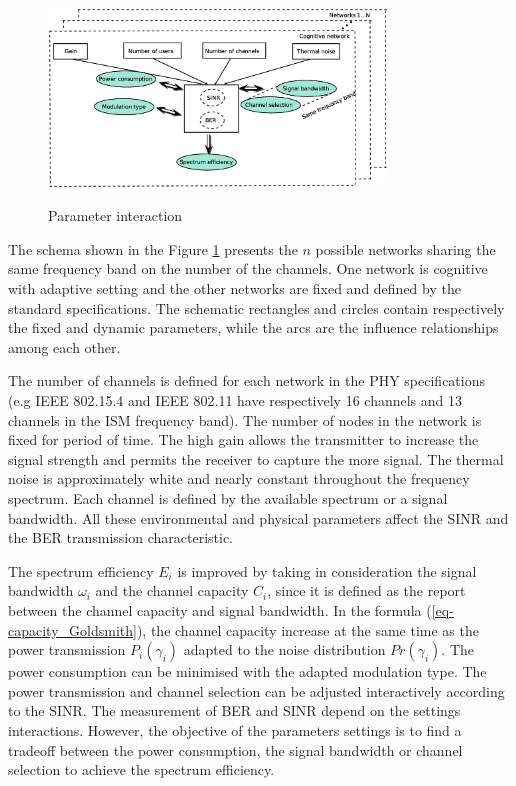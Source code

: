 \documentclass[conference]{IEEEtran}
\begin{document}
\begin{figure}[h]
   \includegraphics[width=9cm]{fig-1bis.eps}\\
   \caption{Parameter interaction} \label{fig-1}
\end{figure}
 
The schema shown in the Figure \ref{fig-1} presents the $n$ possible networks sharing the same frequency band on the number of the channels. One network is cognitive with adaptive setting and the other networks are fixed and defined by the standard specifications. The schematic rectangles and circles contain respectively the fixed and dynamic parameters, while the arcs are the influence relationships among each other. 

The number of channels is defined for each network in the PHY specifications (e.g IEEE 802.15.4 and IEEE 802.11 have respectively 16 channels and 13 channels in the ISM frequency band). The number of nodes in the network is fixed for period of time. The high gain allows the transmitter to increase the signal strength and permits the receiver to capture the more signal. The thermal noise is approximately white and nearly constant throughout the frequency spectrum. Each channel is defined by the available spectrum or a signal bandwidth. All these environmental and physical parameters affect the SINR and the BER transmission characteristic. 

The spectrum efficiency $E_{i}$ is improved by taking in consideration the signal bandwidth $\omega_{i}$ and the channel capacity $C_{i}$, since it is defined as the report between the channel capacity and signal bandwidth. In the formula (\ref{eq-capacity_Goldsmith}), the channel capacity increase at the same time as the power transmission $P_{i}(\gamma_{i})$ adapted to the noise distribution $Pr(\gamma_{i})$. The power consumption can be minimised with the adapted modulation type. The power transmission and channel selection can be adjusted interactively according to the SINR. The measurement of BER and SINR depend on the settings interactions. However, the objective of the parameters settings is to find a tradeoff between the power consumption, the signal bandwidth or channel selection to achieve the spectrum efficiency.
\end{document}
